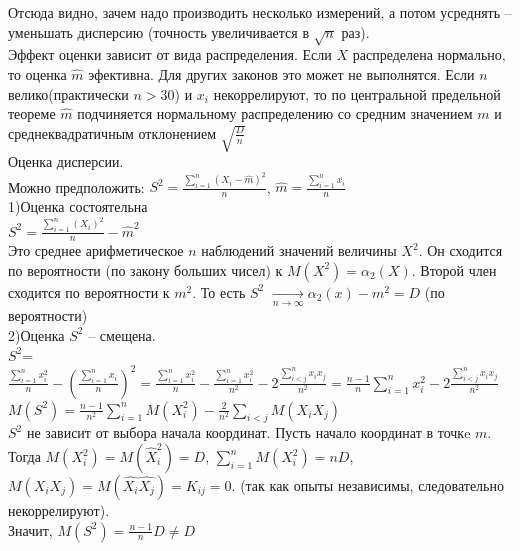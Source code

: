 \documentclass[russian, 12pt, fleqn]{article}
\begin{document}
Отсюда видно, зачем надо производить несколько измерений, а потом усреднять -- уменьшать дисперсию (точность увеличивается  в $\sqrt{n}$ раз).\\
Эффект оценки зависит от вида распределения. Если $X$ распределена нормально, то оценка $\hat{m}$ эфективна.  Для других законов это может не выполнятся. Если $n$
велико(практически $n>30$) и $x_i$ некоррелируют, то по центральной предельной теореме $\hat{m}$ подчиняется нормальному распределению со средним значением $m$ и среднеквадратичным отклонением $\sqrt{\frac{D}{n}}$\\
Оценка дисперсии.\\
Можно предположить: $ S^2 = \frac{ \displaystyle{\sum \limits_{i = 1}^{n}} (X_i - \hat{m})^2 }{n}$, $\hat{m} = \frac{ \displaystyle{\sum \limits_{i = 1}^{n}} x_i}{n}$\\
1)Оценка состоятельна\\
$S^2=\frac{ \displaystyle{\sum \limits_{i = 1}^{n}} (X_i)^2 }{n}- \hat{m}^2$\\
Это среднее  арифметическое $n$ наблюдений значений величины $X^2$. Он сходится по вероятности (по закону больших чисел) к $M(X^2) = \alpha_2(X)$. Второй член сходится по вероятности к $m^2$. То есть $S^2$ $\displaystyle{\underset{n \rightarrow \infty}{\rightarrow}} \alpha_2(x) - m^2 = D$ (по вероятности)\\
2)Оценка $S^2$ -- смещена.\\
$S^2$= $\frac{ \displaystyle{\sum \limits_{i = 1}^{n}}x_i^2 }{n} -  \displaystyle{ \left ( \frac{\sum \limits_{i = 1}^{n}x_i }{n} \right )^2 } = \frac{ \displaystyle{\sum \limits_{i = 1}^{n}}x_i^2 }{n}  - \frac{ \displaystyle{\sum \limits_{i = 1}^{n}}x_i^2 }{n^2} - 2 \frac{ \displaystyle{\sum \limits_{i < j}^{n}}x_ix_j }{n^2}  = \frac{n - 1}{n} \displaystyle{\sum \limits_{i = 1}^{n}}x_i^2  - 2 \frac{ \displaystyle{\sum \limits_{i < j}^{n}}x_ix_j }{n^2}  $  \\
$M(S^2) = \frac{n - 1}{n^2}  \displaystyle{\sum \limits_{i = 1}^{n}}M(X_i^2) - \frac{2}{n^2}  \displaystyle{\sum \limits_{i < j}^{}} M(X_iX_j)$\\
$S^2$ не зависит от выбора начала координат. Пусть начало координат в точкe $m$. Тогда $M(X_i^2) = M(\hat{X}_i^2) =D$, $ \displaystyle{\sum \limits _{i=1} ^ {n}} M(X_i^2) = nD$, $M(X_iX_j) = M(\hat{X_i}\hat{X_j}) = K_{ij} = 0$. (так как опыты независимы, следовательно некоррелируют).\\
Значит, $M(S^2) = \frac{n - 1}{n} D \neq D$\\
\\
\end{document}
